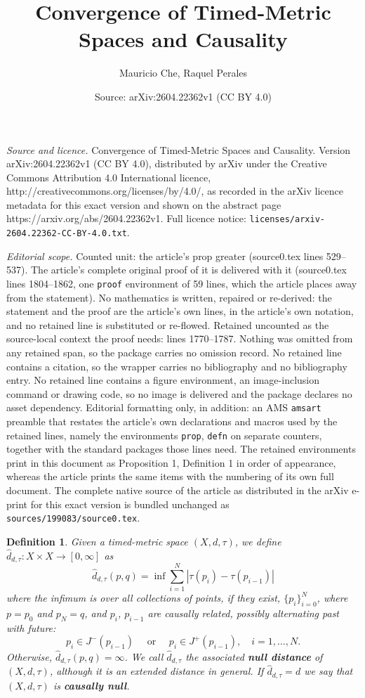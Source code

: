 \documentclass[10pt,a4paper]{amsart}
\title{Convergence of Timed-Metric Spaces and Causality}
\author{Mauricio Che, Raquel Perales}
\date{Source: arXiv:2604.22362v1 (CC BY 4.0)}
\newtheorem{defn}{Definition}
\newcommand{\be}{\begin{equation}}
\newcommand{\ee}{\end{equation}}
\begin{document}
\maketitle

\noindent\emph{Source and licence.} Convergence of Timed-Metric Spaces and Causality. Version arXiv:2604.22362v1 (CC BY 4.0), distributed by arXiv under the Creative Commons Attribution 4.0 International licence, http://creativecommons.org/licenses/by/4.0/, as recorded in the arXiv licence metadata for this exact version and shown on the abstract page https://arxiv.org/abs/2604.22362v1. Full licence notice: \texttt{licenses/arxiv-2604.22362-CC-BY-4.0.txt}.\par\smallskip

\noindent\textit{Editorial scope.} Counted unit: the article's prop greater (source0.tex lines 529--537). The article's complete original proof of it is delivered with it (source0.tex lines 1804--1862, one \texttt{proof} environment of 59 lines, which the article places away from the statement). No mathematics is written, repaired or re-derived: the statement and the proof are the article's own lines, in the article's own notation, and no retained line is substituted or re-flowed.  Retained uncounted as the source-local context the proof needs: lines 1770--1787.  Nothing was omitted from any retained span, so the package carries no omission record.  No retained line contains a citation, so the wrapper carries no bibliography and no bibliography entry.  No retained line contains a figure environment, an image-inclusion command or drawing code, so no image is delivered and the package declares no asset dependency.  Editorial formatting only, in addition: an AMS \texttt{amsart} preamble that restates the article's own declarations and macros used by the retained lines, namely the environments \texttt{prop}, \texttt{defn} on separate counters, together with the standard packages those lines need.  The retained environments print in this document as Proposition 1, Definition 1 in order of appearance, whereas the article prints the same items with the numbering of its own full document.  The complete native source of the article as distributed in the arXiv e-print for this exact version is bundled unchanged as \texttt{sources/199083/source0.tex}.
\begin{defn}\label{defn:null-distance}
Given a timed-metric space $(X,d,\tau)$, 
we define $\hat{d}_{d,\tau}: X \times X \to [0, \infty]$
as
\be\label{eq:null}
\hat{d}_{d,\tau}(p,q)=\inf \sum_{i=1}^{N} |\tau(p_i)-\tau(p_{i-1})| 
\ee
where the infimum is over all collections of points, if they exist, $\{p_i\}_{i=0}^{N}$, where  
$p=p_{0}$ and $p_{N}=q$, and $p_i$, $p_{i-1}$ are causally related, possibly alternating past
with future:
\be\label{eq:null-points}
p_i\in J^-(p_{i-1}) \quad \text{ or } \quad p_i \in J^+(p_{i-1}), \quad 
 i=1,\ldots,N.
\ee
Otherwise, $\hat{d}_{d,\tau}(p,q)=\infty$. 
We call $\hat{d}_{d,\tau}$ the  associated \textbf{null distance} of 
$(X,d,\tau)$, although it is an extended distance in general. If $\hat{d}_{d,\tau}=d$ we say that $(X,d,\tau)$ is \textbf{causally null}.  
\end{defn}
\end{document}
